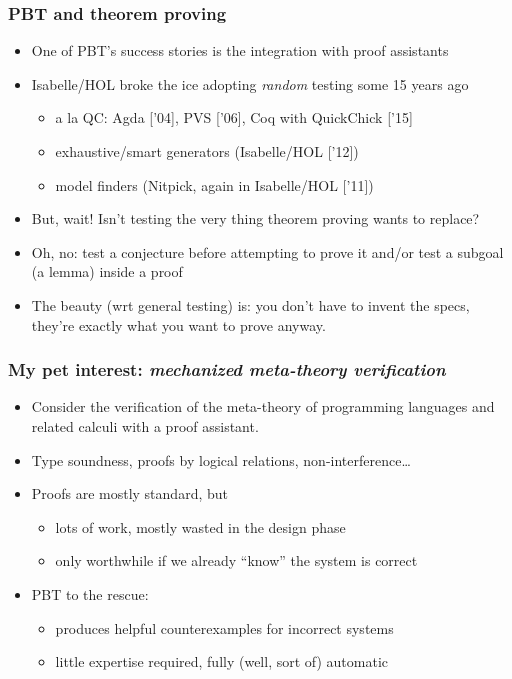 \documentclass{beamer}
\newcommand{\red}[1]{{\color{red} #1}}
\begin{document}
\begin{frame}
  \frametitle{PBT and theorem proving}
  \begin{itemize}
  \item One of PBT's success stories is the integration with proof assistants
  \item Isabelle/HOL broke the ice adopting
    \emph{random} testing some 15 years ago %
    \begin{itemize}
    \item  a la QC: Agda ['04], PVS ['06], Coq
    with QuickChick ['15]
  \item exhaustive/smart generators (Isabelle/HOL ['12])
  \item model finders (Nitpick, again in Isabelle/HOL ['11])
  \end{itemize}
\item But, wait! Isn't testing the very thing theorem proving wants to replace?
\item Oh, no: test a conjecture before attempting to prove it and/or
  test a subgoal (a lemma) inside a proof
\item The beauty (wrt general testing) is: you don't
  have to invent the specs, they're exactly what you want to prove
  anyway.
  \end{itemize}
\end{frame}
\begin{frame}\frametitle{My pet interest: \emph{mechanized
    meta-theory verification}}
\begin{itemize}
\item Consider the verification of the meta-theory of programming languages and related calculi with a proof assistant.
\item  Type soundness, proofs by logical relations, non-interference\dots
\item Proofs are mostly standard, but
  \begin{itemize}
  \item lots of work, mostly wasted in the
  \red{design} phase
\item only worthwhile
  if \red{we already ``know'' the system is correct}
\end{itemize}

\item PBT to the rescue:
\begin{itemize}
  \item produces helpful counterexamples for incorrect systems
  \item little expertise required, fully (well, sort of) automatic
\end{itemize}
  \end{itemize}
\end{frame}
\end{document}
